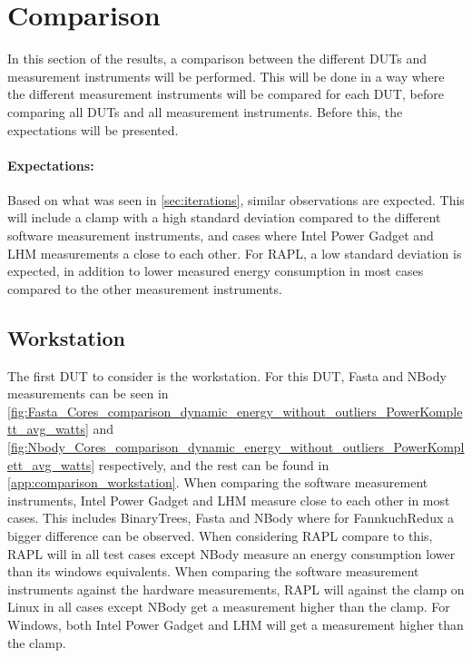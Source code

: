 \section{Comparison}\label{sec:comparison}

In this section of the results, a comparison between the different DUTs and measurement instruments will be performed. This will be done in a way where the different measurement instruments will be compared for each DUT, before comparing all DUTs and all measurement instruments. Before this, the expectations will be presented.

\paragraph{Expectations:} Based on what was seen in \cref{sec:iterations}, similar observations are expected. This will include a clamp with a high standard deviation compared to the different software measurement instruments, and cases where Intel Power Gadget and LHM measurements a close to each other. For RAPL, a low standard deviation is expected, in addition to lower measured energy consumption in most cases compared to the other measurement instruments.

\subsection{Workstation}




The first DUT to consider is the workstation. For this DUT, Fasta and NBody measurements can be seen in \cref{fig:Fasta_Cores_comparison_dynamic_energy_without_outliers_PowerKomplett_avg_watts} and \cref{fig:Nbody_Cores_comparison_dynamic_energy_without_outliers_PowerKomplett_avg_watts} respectively, and the rest can be found in \cref{app:comparison_workstation}. When comparing the software measurement instruments, Intel Power Gadget and LHM measure close to each other in most cases. This includes BinaryTrees, Fasta and NBody where for FannkuchRedux a bigger difference can be observed. When considering RAPL compare to this, RAPL will in all test cases except NBody measure an energy consumption lower than its windows equivalents. When comparing the software measurement instruments against the hardware measurements, RAPL will against the clamp on Linux in all cases except NBody get a measurement higher than the clamp. For Windows, both Intel Power Gadget and LHM will get a measurement higher than the clamp.

